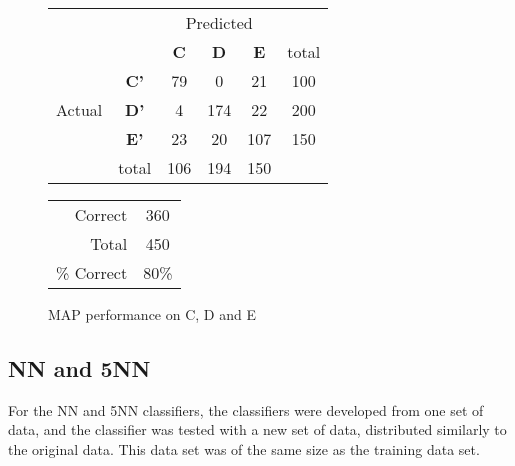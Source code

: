 \begin{figure}[!ht]
\begin{minipage}[b]{0.5\linewidth}
\centering
	\begin{tabular}{ccc|c|c|c}
	 & &\multicolumn{3}{c}{Predicted} &\\
	  & & \bf{C} &  \bf{D} & \bf{E} & total \\
	 \cline{3-5}
	 \multirow{3}{*}{\begin{sideways}Actual\end{sideways}} & \bf{C'}& 79 & 0 & 21 & 100\\
	 \cline{3-6}
	 & \bf{D'}& 4 & 174 & 22 & 200\\
	  \cline{3-6}
	 & \bf{E'}& 23 & 20 & 107 &  150\\
	  \cline{3-6}
	 &total&106&194&150\\
	\end{tabular}
\end{minipage}
\hspace{0.5cm}
\begin{minipage}[b]{0.5\linewidth}
	\begin{tabular}{r|c}
	\hline
	Correct& 360\\
	Total& 450\\
	\hline
	\% Correct& 80\%\\
	\hline
	\end{tabular}
\end{minipage}
\vspace{1mm}
\caption{MAP performance on C, D and E}
\end{figure}


\clearpage

\subsection{NN and 5NN}

For the NN and 5NN classifiers, the classifiers were developed from one set of data, and the classifier was tested with a new set of data, distributed similarly to the original data. This data set was of the same size as the training data set.

